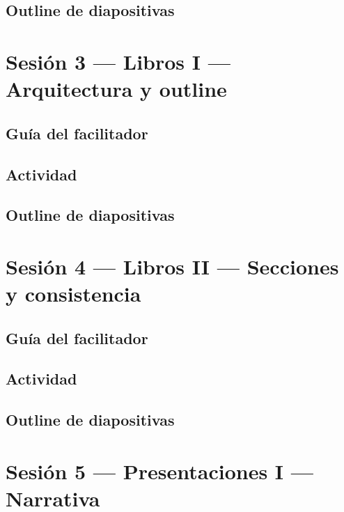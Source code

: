 \documentclass[11pt,a4paper]{report}
\begin{document}
\subsection*{Outline de diapositivas}


\section{Sesión 3 --- Libros I --- Arquitectura y outline}

\subsection*{Guía del facilitador}

\subsection*{Actividad}

\subsection*{Outline de diapositivas}


\section{Sesión 4 --- Libros II --- Secciones y consistencia}

\subsection*{Guía del facilitador}

\subsection*{Actividad}

\subsection*{Outline de diapositivas}


\section{Sesión 5 --- Presentaciones I --- Narrativa}

\end{document}
